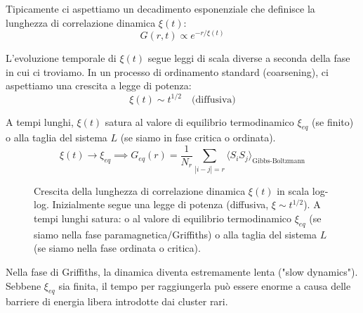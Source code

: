 \noindent Tipicamente ci aspettiamo un decadimento esponenziale che definisce la lunghezza di correlazione dinamica $\xi(t)$:
\begin{equation}
G(r, t) \propto e^{-r/\xi(t)}
\end{equation}

\noindent L'evoluzione temporale di $\xi(t)$ segue leggi di scala diverse a seconda della fase in cui ci troviamo. In un processo di ordinamento standard (coarsening), ci aspettiamo una crescita a legge di potenza:
\begin{equation}
\xi(t) \sim t^{1/2} \quad \text{(diffusiva)}
\end{equation}

\noindent A tempi lunghi, $\xi(t)$ satura al valore di equilibrio termodinamico $\xi_{eq}$ (se finito) o alla taglia del sistema $L$ (se siamo in fase critica o ordinata).
\begin{equation}
\xi(t) \to \xi_{eq} \implies G_{eq}(r) = \frac{1}{N_r} \sum_{|i-j|=r} \langle S_i S_j \rangle_{\text{Gibbs-Boltzmann}}
\end{equation}

\begin{figure}[H]
    \centering
    \caption{Crescita della lunghezza di correlazione dinamica $\xi(t)$ in scala log-log. Inizialmente segue una legge di potenza (diffusiva, $\xi \sim t^{1/2}$). A tempi lunghi satura: o al valore di equilibrio termodinamico $\xi_{eq}$ (se siamo nella fase paramagnetica/Griffiths) o alla taglia del sistema $L$ (se siamo nella fase ordinata o critica).}
    \label{fig:dynamic_growth}
\end{figure}


Nella fase di Griffiths, la dinamica diventa estremamente lenta ("slow dynamics"). Sebbene $\xi_{eq}$ sia finita, il tempo per raggiungerla può essere enorme a causa delle barriere di energia libera introdotte dai cluster rari.


